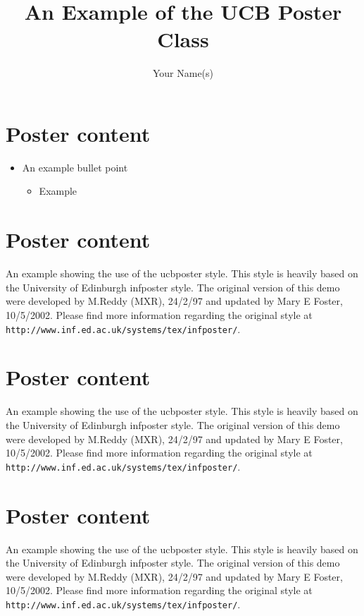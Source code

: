 \documentclass{ucbposter}
\begin{document}
\title{An Example of the UCB Poster Class}
\author{Your Name(s)}
\makeposter

\section{Poster content}

\begin{itemize}
  \item An example bullet point
  \begin{itemize}
    \item Example
  \end{itemize}
\end{itemize}

\section{Poster content}

An example showing the use of the ucbposter style. This style is
heavily based on the University of Edinburgh infposter style. The
original version of this demo were developed by M.Reddy (MXR), 24/2/97
and updated by Mary E Foster, 10/5/2002. Please find more information
regarding the original style at {\tt
http://www.inf.ed.ac.uk/systems/tex/infposter/}.

\section{Poster content}

An example showing the use of the ucbposter style. This style is
heavily based on the University of Edinburgh infposter style. The
original version of this demo were developed by M.Reddy (MXR), 24/2/97
and updated by Mary E Foster, 10/5/2002. Please find more information
regarding the original style at {\tt
http://www.inf.ed.ac.uk/systems/tex/infposter/}.

\section{Poster content}

An example showing the use of the ucbposter style. This style is
heavily based on the University of Edinburgh infposter style. The
original version of this demo were developed by M.Reddy (MXR), 24/2/97
and updated by Mary E Foster, 10/5/2002. Please find more information
regarding the original style at {\tt
http://www.inf.ed.ac.uk/systems/tex/infposter/}.
\end{document}
